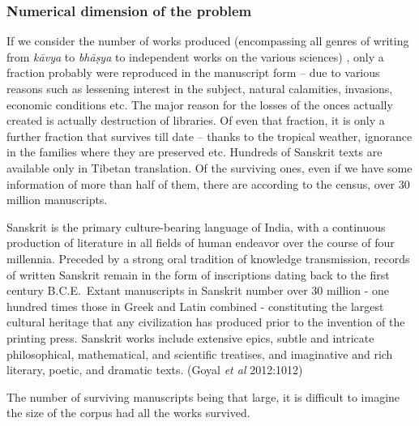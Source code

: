 \newpage

\subsubsection{Numerical dimension of the problem}

{\leftskip=10pt\par}


If we consider the number of works produced (encompassing all genres of writing from {\sl kāvya} to {\sl bhāṣya} to independent works on the various sciences) , only a fraction probably were reproduced in the manuscript form – due to various reasons such as lessening interest in the subject, natural calamities, invasions, economic conditions etc. The major reason for the losses of the onces actually created is actually destruction of libraries.  Of even that fraction, it is only a further fraction that survives till date – thanks to the tropical weather, ignorance in the families where they are preserved etc. Hundreds of Sanskrit texts are available only in Tibetan translation. Of the surviving ones, even if we have some information of more than half of them, there are according to the census, over 30 million manuscripts. 
\begin{myquote}
\eleven
Sanskrit is the primary culture-bearing language of India, with a continuous production of literature in all fields of human endeavor over the course of four millennia. Preceded by a strong oral tradition of knowledge transmission, records of written Sanskrit remain in the form of inscriptions dating back to the first century B.C.E.\ Extant manuscripts in Sanskrit number over 30 million - one hundred times those in Greek and Latin combined - constituting the largest cultural heritage that any civilization has produced prior to the invention of the printing press. Sanskrit works include extensive epics, subtle and intricate philosophical, mathematical, and scientific treatises, and imaginative and rich literary, poetic, and dramatic texts.	\hfill (Goyal {\sl et al} 2012:1012)
\end{myquote}

The number of surviving manuscripts being that large, it is difficult to imagine the size of the corpus had all the works survived. 

